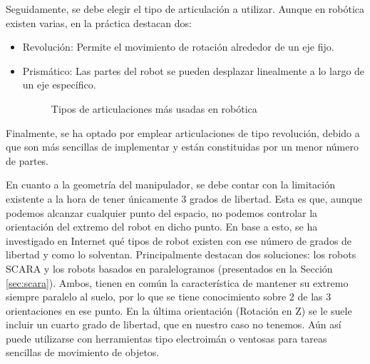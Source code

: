 Seguidamente, se debe elegir el tipo de articulación a utilizar. Aunque en robótica existen varias, en la práctica destacan dos:
\begin{itemize}
\item Revolución: Permite el movimiento de rotación alrededor de un eje fijo.
\item Prismático: Las partes del robot se pueden desplazar linealmente a lo largo de un eje específico. 

\begin{figure} [h!]
  \centering    
  \hspace{1cm}
  \caption{Tipos de articulaciones más usadas en robótica}
\end{figure}

\end{itemize}

Finalmente, se ha optado por emplear articulaciones de tipo revolución, debido a que son más sencillas de implementar y 
están constituidas por un menor número de partes.

En cuanto a la geometría del manipulador, se debe contar con la limitación existente a la hora de tener únicamente 3 grados de libertad. Esta es 
que, aunque podemos alcanzar cualquier punto del espacio, no podemos controlar la orientación del extremo del robot en dicho punto. En base a esto, 
se ha investigado en Internet qué tipos de robot existen con ese número de grados de libertad y como lo solventan. Principalmente destacan dos 
soluciones: los robots SCARA y los robots basados en paralelogramos (presentados en la Sección \ref{sec:scara}). Ambos, tienen en común la 
característica de mantener su extremo siempre paralelo al suelo, por lo que se tiene conocimiento sobre 2 de las 3 orientaciones en ese punto. En 
la última orientación (Rotación en Z) se le suele incluir un cuarto grado de libertad, que en nuestro caso no tenemos. Aún así puede utilizarse con 
herramientas tipo electroimán o ventosas para tareas sencillas de movimiento de objetos.

